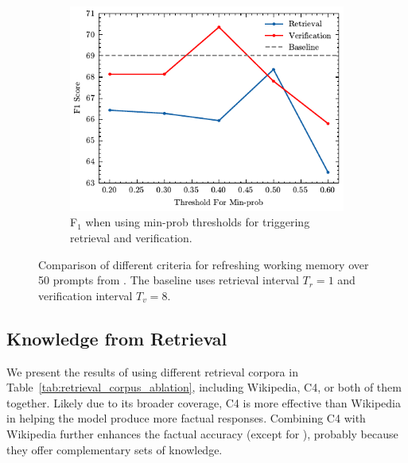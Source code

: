 \begin{figure}[t!]
\begin{subfigure}[t]{0.32\textwidth}
    \end{subfigure}
    \hfill
    \begin{subfigure}[t]{0.32\textwidth}
        \centering
            \includegraphics[width=\textwidth]{figures/prob_threshold.pdf}
        \caption{F$_1$ when using min-prob thresholds for triggering retrieval and verification.}
            \label{fig:interval-prob}

    \end{subfigure}
\caption{Comparison of different criteria for refreshing working memory over 50 prompts from \lf. The baseline uses retrieval interval $T_r = 1$ and verification interval $T_v = 8$.}
\label{fig:interval}
\end{figure}


\subsection{Knowledge from Retrieval}



We present the results of using different retrieval corpora in Table~\ref{tab:retrieval_corpus_ablation}, including Wikipedia, C4, or both of them together.
Likely due to its broader coverage, C4 is more effective than Wikipedia in helping the model produce more factual responses. 
Combining C4 with Wikipedia further enhances the factual accuracy (except for \bio), probably because they offer complementary sets of knowledge.










